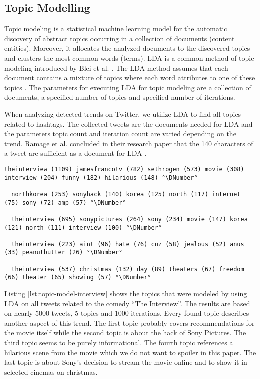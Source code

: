 \subsection{Topic Modelling}
\label{subsec:topic-modelling}
Topic modeling is a statistical machine learning model for the automatic discovery of abstract topics occurring in a collection of documents (content entities). Moreover, it allocates the analyzed documents to the discovered topics and clusters the most common words (terms). LDA is a common method of topic modeling introduced by Blei et al. \cite{Blei03lda}. The LDA method assumes that each document contains a mixture of topics where each word attributes to one of these topics \cite{Blei03lda}. The parameters for executing LDA for topic modeling are a collection of documents, a specified number of topics and specified number of iterations.

When analyzing detected trends on Twitter, we utilize LDA to find all topics related to hashtags. The collected tweets are the documents needed for LDA and the parameters topic count and iteration count are varied depending on the trend. Ramage et al. concluded in their research paper that the 140 characters of a tweet are sufficient as a document for LDA \cite{ramage2010lda}.

\begin{lstlisting}[caption={[Topic Model for the Sony hack concerning the movie \enquote{The Interview}] Topic Model for the Sony hack concerning the movie \enquote{The Interview}}, label={lst:topic-model-interview}, float=h]
  theinterview (1109) jamesfrancotv (782) sethrogen (573) movie (308) interview (204) funny (182) hilarious (148) °\DNumber°

  northkorea (253) sonyhack (140) korea (125) north (117) internet (75) sony (72) amp (57) °\DNumber°

  theinterview (695) sonypictures (264) sony (234) movie (147) korea (121) north (111) interview (100) °\DNumber°

  theinterview (223) aint (96) hate (76) cuz (58) jealous (52) anus (33) peanutbutter (26) °\DNumber°

  theinterview (537) christmas (132) day (89) theaters (67) freedom (66) theater (65) showing (57) °\DNumber°
\end{lstlisting}

Listing \ref{lst:topic-model-interview} shows the topics that were modeled by using LDA on all tweets related to the comedy \enquote{The Interview}. The results are based on nearly 5000 tweets, 5 topics and 1000 iterations. Every found topic describes another aspect of this trend. The first topic probably covers recommendations for the movie itself while the second topic is about the hack of Sony Pictures. The third topic seems to be purely informational. The fourth topic references a hilarious scene from the movie which we do not want to spoiler in this paper. The last topic is about Sony's decision to stream the movie online and to show it in selected cinemas on christmas.

